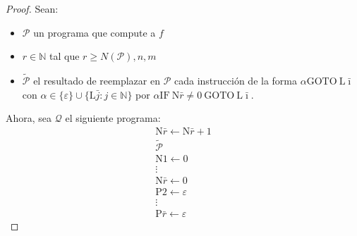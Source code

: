 \begin{frame}
  \begin{proof}
    \PN Sean:
    \begin{itemize}
      \item $\mathcal{P}$ un programa que compute a $f$
      \item $r \in \mathbb{N}$ tal que $r \geq N(\mathcal{P}), n, m$
      \item $\mathcal{\tilde{P}}$ el resultado de reemplazar en $\mathcal{P}$ cada instrucción de la forma $\alpha
      \mathrm{GOTO} \ \mathrm{L}\bar{\imath}$ con $\alpha \in \{\varepsilon\} \cup \{\mathrm{L}\bar{j}: j \in
      \mathbb{N}\}$ por $\alpha \mathrm{IF \ N}\bar{r} \neq 0 \ \mathrm{GOTO} \ \mathrm{L}\bar{\imath}$.
    \end{itemize}

    \PN Ahora, sea $\mathcal{Q}$ el siguiente programa:
    \begin{equation*}
      \begin{array}{l}
        \mathrm{N}\bar{r} \leftarrow \mathrm{N}\bar{r} + 1 \\
        \mathcal{\tilde{P}} \\
        \mathrm{N}1\leftarrow 0 \\
        \vdots \\
        \mathrm{N}\bar{r} \leftarrow 0 \\
        \mathrm{P}2 \leftarrow \varepsilon  \\
        \vdots \\
        \mathrm{P}\bar{r} \leftarrow \varepsilon
      \end{array}
    \end{equation*}
  \end{proof}
\end{frame}
